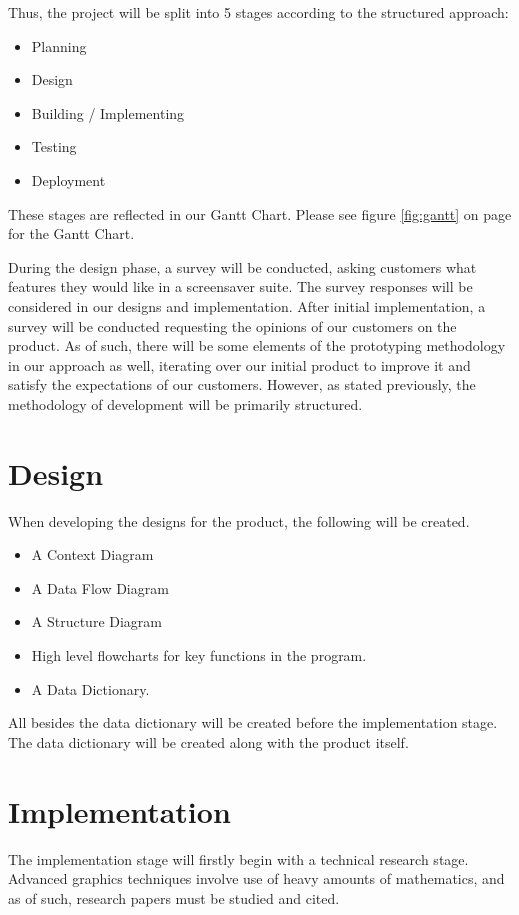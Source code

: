\documentclass[10pt, openany]{book}
\begin{document}
Thus, the project will be split into 5 stages according to the structured approach:
\begin{itemize}
	\item Planning
	\item Design
	\item Building / Implementing
	\item Testing
	\item Deployment	
\end{itemize}	

These stages are reflected in our Gantt Chart.
Please see figure \ref{fig:gantt} on page \pageref{fig:gantt} for the Gantt Chart.

During the design phase, a survey will be conducted, asking customers what features they would like in a screensaver suite. The survey responses will be considered in our designs and implementation.
After initial implementation, a survey will be conducted requesting the opinions of our customers on the product. As of such, there will be some elements of the prototyping methodology in our approach as well, iterating over our initial product to improve it and satisfy the expectations of our customers. However, as stated previously, the methodology of development will be primarily structured.

\section{Design}
When developing the designs for the product, the following will be created.
\begin{itemize}
	\item A Context Diagram
	\item A Data Flow Diagram	
	\item A Structure Diagram
	\item High level flowcharts for key functions in the program.
	\item A Data Dictionary.
\end{itemize}	
All besides the data dictionary will be created before the implementation stage. The data dictionary will be created along with the product itself.  

\section{Implementation}
The implementation stage will firstly begin with a technical research stage. Advanced graphics techniques involve use of heavy amounts of mathematics, and as of such, research papers must be studied and cited.
\end{document}
